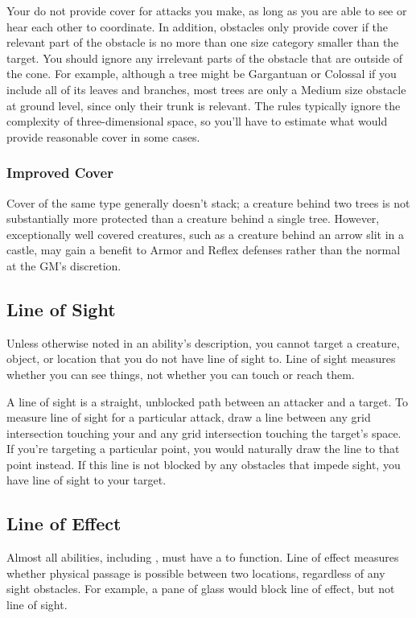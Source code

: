       Your  do not provide cover for attacks you make, as long as you are able to see or hear each other to coordinate.
      In addition, obstacles only provide cover if the relevant part of the obstacle is no more than one size category smaller than the target.
      You should ignore any irrelevant parts of the obstacle that are outside of the cone.
      For example, although a tree might be Gargantuan or Colossal if you include all of its leaves and branches, most trees are only a Medium size obstacle at ground level, since only their trunk is relevant.
      The rules typically ignore the complexity of three-dimensional space, so you'll have to estimate what would provide reasonable cover in some cases.

    \subsubsection{Improved Cover}
      Cover of the same type generally doesn't stack; a creature behind two trees is not substantially more protected than a creature behind a single tree.
      However, exceptionally well covered creatures, such as a creature behind an arrow slit in a castle, may gain a  benefit to Armor and Reflex defenses rather than the normal  at the GM's discretion.

  \subsection{Line of Sight}\label{Line of Sight}
    Unless otherwise noted in an ability's description, you cannot target a creature, object, or location that you do not have line of sight to.
    Line of sight measures whether you can see things, not whether you can touch or reach them.

    A line of sight is a straight, unblocked path between an attacker and a target.
    To measure line of sight for a particular attack, draw a line between any grid intersection touching your  and any grid intersection touching the target's space.
    If you're targeting a particular point, you would naturally draw the line to that point instead.
    If this line is not blocked by any obstacles that impede sight, you have line of sight to your target.

  \subsection{Line of Effect}\label{Line of Effect}
    Almost all abilities, including , must have a  to function.
    Line of effect measures whether physical passage is possible between two locations, regardless of any sight obstacles.
    For example, a pane of glass would block line of effect, but not line of sight.

